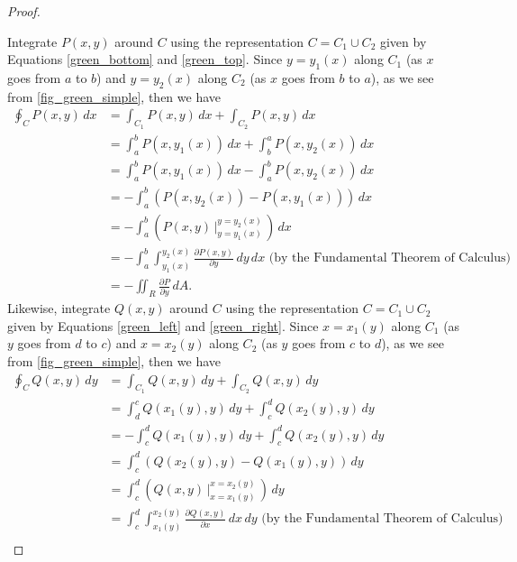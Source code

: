 \begin{proof}
\begin{lxfigure}
\begin{center}
 \label{fig_green_simple}
 \end{center}
 \end{lxfigure}
 Integrate $P(x,y)$ around $C$ using the representation $C = C_1 \cup C_2$ given by Equations \eqref{green_bottom} and \eqref{green_top}. Since $y = y_1(x)$ along $C_1$ (as $x$ goes from $a$ to $b$) and $y = y_2(x)$ along $C_2$ (as $x$ goes from $b$ to $a$), as we see from \autoref{fig_green_simple}, then we have
 \begin{align*}
  \oint_C P(x,y)\,dx &= \int_{C_1} P(x,y)\,dx + \int_{C_2} P(x,y)\,dx\\
   &= \int_a^b P(x,y_1(x))\,dx + \int_b^a P(x,y_2(x))\,dx\\
   &= \int_a^b P(x,y_1(x))\,dx - \int_a^b P(x,y_2(x))\,dx\\[6pt]
   &= -\int_a^b \left( P(x,y_2(x)) - P(x,y_1(x)) \right)\,dx\\[6pt]
   &= -\int_a^b \left( P(x,y) \,\Big|_{y = y_1(x)}^{y = y_2(x)} \,\right)\,dx\\[6pt]
   &= -\int_a^b \int_{y_1(x)}^{y_2(x)} \frac{\partial P(x,y)}{\partial y}\,dy\,dx \text{ (by the Fundamental Theorem of Calculus)}\\[6pt]
   &= -\iint_{R} \frac{\partial P}{\partial y}\,dA .
 \end{align*}
 Likewise, integrate $Q(x,y)$ around $C$ using the representation $C = C_1 \cup C_2$ given by Equations \eqref{green_left} and \eqref{green_right}. Since $x = x_1(y)$ along $C_1$ (as $y$ goes from $d$ to $c$) and $x = x_2(y)$ along $C_2$ (as $y$ goes from $c$ to $d$), as we see from \autoref{fig_green_simple}, then we have
 \begin{align*}
  \oint_C Q(x,y)\,dy &= \int_{C_1} Q(x,y)\,dy + \int_{C_2} Q(x,y)\,dy\\
   &= \int_d^c Q(x_1(y),y)\,dy + \int_c^d Q(x_2(y),y)\,dy\\
   &= -\int_c^d Q(x_1(y),y)\,dy + \int_c^d Q(x_2(y),y)\,dy\\[6pt]
   &= \int_c^d \left( Q(x_2(y),y) - Q(x_1(y),y) \right)\,dy\\[6pt]
   &= \int_c^d \left( Q(x,y) \,\Big|_{x = x_1(y)}^{x = x_2(y)} \,\right)\,dy\\[6pt]
   &= \int_c^d \int_{x_1(y)}^{x_2(y)} \frac{\partial Q(x,y)}{\partial x}\,dx\,dy \text{ (by the Fundamental Theorem of Calculus)}\\[6pt]

\end{align*}
\end{proof}

